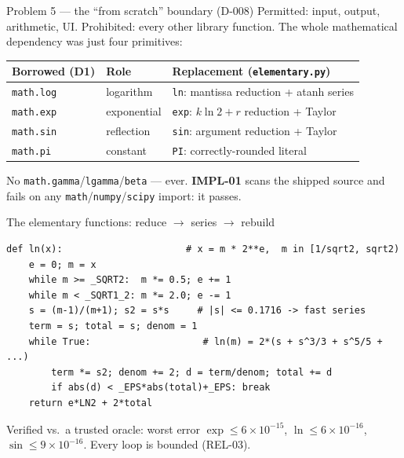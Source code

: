 \documentclass[aspectratio=169]{beamer}
\begin{document}
\begin{frame}{Problem 5 --- the ``from scratch'' boundary (D-008)}
Permitted: input, output, arithmetic, UI. Prohibited: every other library function.
The whole mathematical dependency was just four primitives:
\begin{center}\small
\begin{tabular}{@{}lll@{}}
\toprule
Borrowed (D1) & Role & Replacement (\texttt{elementary.py})\\
\midrule
\texttt{math.log} & logarithm & \texttt{ln}: mantissa reduction + atanh series\\
\texttt{math.exp} & exponential & \texttt{exp}: $k\ln2{+}r$ reduction + Taylor\\
\texttt{math.sin} & reflection & \texttt{sin}: argument reduction + Taylor\\
\texttt{math.pi} & constant & \texttt{PI}: correctly-rounded literal\\
\bottomrule
\end{tabular}
\end{center}
No \texttt{math.gamma}/\texttt{lgamma}/\texttt{beta} --- ever.
\textbf{IMPL-01} scans the shipped source and fails on any \texttt{math}/\texttt{numpy}/\texttt{scipy} import: it passes.
\end{frame}

\begin{frame}[fragile]{The elementary functions: reduce $\to$ series $\to$ rebuild}
\begin{lstlisting}
def ln(x):                      # x = m * 2**e,  m in [1/sqrt2, sqrt2)
    e = 0; m = x
    while m >= _SQRT2:  m *= 0.5; e += 1
    while m < _SQRT1_2: m *= 2.0; e -= 1
    s = (m-1)/(m+1); s2 = s*s     # |s| <= 0.1716 -> fast series
    term = s; total = s; denom = 1
    while True:                    # ln(m) = 2*(s + s^3/3 + s^5/5 + ...)
        term *= s2; denom += 2; d = term/denom; total += d
        if abs(d) < _EPS*abs(total)+_EPS: break
    return e*LN2 + 2*total
\end{lstlisting}
\footnotesize Verified vs.\ a trusted oracle: worst error $\exp\le6\times10^{-15}$, $\ln\le6\times10^{-16}$, $\sin\le9\times10^{-16}$.
Every loop is bounded (REL-03).
\end{frame}
\end{document}
